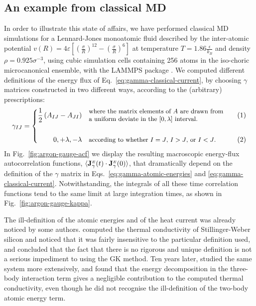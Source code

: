 \subsection{An example from classical MD}
In order to illustrate this state of affairs, we have performed classical MD simulations for a Lennard-Jones monoatomic fluid described by the inter-atomic potential $v(R) = 4\varepsilon \left[ \left( \frac{\sigma}{R}\right)^{12} - \left(\frac{\sigma}{R} \right)^{6} \right]$ at temperature $T=1.86 \frac{\epsilon}{k_B}$ and density $\rho=0.925 \sigma^{-3}$, using cubic simulation cells containing 256 atoms in the iso-choric microcanonical ensemble, with the LAMMPS package \cite{LAMMPS1995}. 
We computed different definitions of the energy flux of Eq.~\eqref{eq:gamma-classical-current}, by choosing $\gamma$ matrices constructed in two different ways, according to the (arbitrary) prescriptions:
\begin{equation}
\setbox0=\vbox{\hsize=68mm \small\noindent where the matrix
      elements of $A$ are drawn from a uniform deviate  in the
      $[0,\lambda]$ interval.}
\setbox1 \vbox{\hsize=68mm \small\noindent according to whether $I=J$,
  $I>J$, or $I<J$.}
\gamma_{IJ}= \left \{
  \begin{alignedat}{2}
    \frac{1}{2} \left(A_{IJ}-A_{JI}\right ) & \quad\raise -0.3\ht0
    \box0 && \qquad (1) \\
\\
    0, +\lambda, -\lambda & \quad \box1 && \qquad (2) \\
  \end{alignedat} \right .
\label{eq:gamma-definitions}
\end{equation}
In Fig.~\ref{fig:argon-gauge-acf} we display the resulting macroscopic energy-flux autocorrelation functions, $\langle \mathbf{J}_{\gamma}^{{\scriptscriptstyle E}}(t) \cdot \mathbf{J}_{\gamma}^{{\scriptscriptstyle E}}(0) \rangle$, that dramatically depend on the definition of the $\gamma$ matrix in Eqs.~\eqref{eq:gamma-atomic-energies} and \eqref{eq:gamma-classical-current}.  Notwithstanding, the integrals of all these time correlation functions tend to the same limit at large integration times, as shown in Fig.~\ref{fig:argon-gauge-kappa}.

The ill-definition of the atomic energies and of the heat current was already noticed by some authors. \textcite{Schelling2002} computed the thermal conductivity of Stillinger-Weber \cite{Stillinger1985} silicon and noticed that it was fairly insensitive to the particular definition used, and concluded that the fact that there is no rigorous and unique definition is not a serious impediment to using the GK method. Ten years later, \textcite{Howell2012} studied the same system more extensively, and found that the energy decomposition in the three-body interaction term gives a negligible contribution to the computed thermal conductivity, even though he did not recognise the ill-definition of the two-body atomic energy term.

